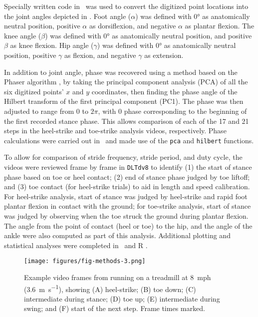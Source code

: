 Specially written code in \Matlab\ was used to convert the digitized point locations into the joint angles depicted in . Foot angle ($\alpha$) was defined with \ang{0} as anatomically neutral position, positive $\alpha$ as dorsiflexion, and negative $\alpha$ as plantar flexion. The knee angle ($\beta$) was defined with \ang{0} as anatomically neutral position, and positive $\beta$ as knee flexion. Hip angle ($\gamma$) was defined with \ang{0} as anatomically neutral position, positive $\gamma$ as flexion, and negative $\gamma$ as extension. 

In addition to joint angle, phase was recovered using a method based on the Phaser algorithm \citep{revzen2008estimating}, by taking the principal component analysis (PCA) of all the six digitized points' $x$ and $y$ coordinates, then finding the phase angle of the Hilbert transform of the first principal component (PC1). The phase was then adjusted to range from 0 to $2\pi$, with 0 phase corresponding to the beginning of the first recorded stance phase. This allows comparison of each of the 17 and 21 steps in the heel-strike and toe-strike analysis videos, respectively. Phase calculations were carried out in \Matlab\ and made use of the \lstinline{pca} and \lstinline{hilbert} functions. 

To allow for comparison of stride frequency, stride period, and duty cycle, the videos were reviewed frame by frame in \lstinline{DLTdv8} to identify (1) the start of stance phase based on toe or heel contact; (2) end of stance phase judged by toe liftoff; and (3) toe contact (for heel-strike trials) to aid in length and speed calibration.  For heel-strike analysis, start of stance was judged by heel-strike and rapid foot plantar flexion in contact with the ground; for toe-strike analysis, start of stance was judged by observing when the toe struck the ground during plantar flexion. The angle from the point of contact (heel or toe) to the hip, and the angle of the ankle were also computed as part of this analysis. Additional plotting and statistical analyses were completed in \Matlab\ and R \citep{r2020}. 

\begin{figure}
\begin{center}
\texttt{[image: figures/fig-methods-3.png]}
\end{center}
\caption{Example video frames from running on a treadmill at \SI{8}{mph} (\SI{3.6}{\meter\per\second}), showing (A) heel-strike; (B) toe down; (C) intermediate during stance; (D) toe up; (E) intermediate during swing; and (F) start of the next step. Frame times marked.} 
\label{fig:methods:dltdv8-2}
\end{figure}


